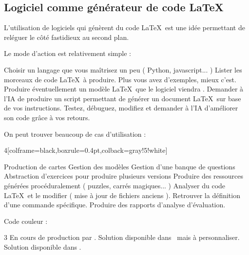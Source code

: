 \subsection{Logiciel comme générateur de code LaTeX}

\begin{tcolorbox}[blank]
    
    L'utilisation de logiciels qui génèrent du code \LaTeX\ est une idée permettant de reléguer le côté fastidieux au second plan. 

Le mode d'action est relativement simple : 
\begin{tcbenumerate}
    \tcbitem Choisir un langage que vous maîtrisez un peu ( Python, javascript... )
    \tcbitem Lister les morceaux de code \LaTeX\ à produire. Plus vous avez d'exemples, mieux c'est. 
    \tcbitem Produire éventuellement un modèle \LaTeX\ que le logiciel viendra .
    \tcbitem Demander à l'IA de produire un script permettant de générer un document \LaTeX\ sur base de vos instructions.
    \tcbitem Testez, débuguez, modifiez et demander à l'IA d'améliorer son code grâce à vos retours.
\end{tcbenumerate}

On peut trouver beaucoup de cas d'utilisation : 

\begin{MultiColonnes}{4}[colframe=black,boxrule=0.4pt,colback=gray!5!white]%


    \tcbitem[colback=blue!10!white] Production de cartes
    \tcbitem[colback=green!10!white] Gestion des modèles
    \tcbitem[colback=yellow!10!white] Gestion d'une banque de questions
    \tcbitem[colback=yellow!10!white] Abstraction d'exercices pour produire plusieurs versions
    \tcbitem[colback=yellow!10!white] Produire des ressources générées procéduralement ( puzzles, carrés magiques... )
    \tcbitem[colback=yellow!10!white] Analyser du code \LaTeX\ et le modifier ( mise à jour de fichiers anciens ). 
    \tcbitem[colback=green!10!white] Retrouver la définition d'une commande spécifique. 
    \tcbitem[colback=green!10!white] Produire des rapports d'analyse d'évaluation.
\end{MultiColonnes}

Code couleur :

\begin{MultiColonnes}{3}%
    \tcbitem[colback=yellow!10!white] En cours de production par \bfcours.
    \tcbitem[colback=blue!10!white] Solution disponible dans \bfcours\ mais à personnaliser.
    \tcbitem[colback=green!10!white] Solution disponible dans \bfcours.
\end{MultiColonnes}
\end{tcolorbox}